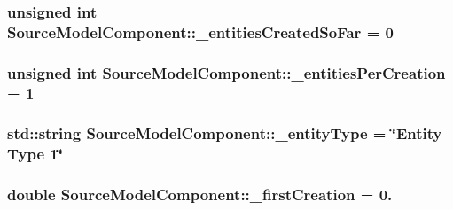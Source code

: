 \subsubsection[{\texorpdfstring{\+\_\+entities\+Created\+So\+Far}{_entitiesCreatedSoFar}}]{\setlength{\rightskip}{0pt plus 5cm}unsigned int Source\+Model\+Component\+::\+\_\+entities\+Created\+So\+Far = 0\hspace{0.3cm}{\ttfamily [protected]}}\hypertarget{class_source_model_component_af1f4fb38d2c0c4ac08235d7aec131bc9}{}\label{class_source_model_component_af1f4fb38d2c0c4ac08235d7aec131bc9}
\subsubsection[{\texorpdfstring{\+\_\+entities\+Per\+Creation}{_entitiesPerCreation}}]{\setlength{\rightskip}{0pt plus 5cm}unsigned int Source\+Model\+Component\+::\+\_\+entities\+Per\+Creation = 1\hspace{0.3cm}{\ttfamily [protected]}}\hypertarget{class_source_model_component_a68b0576903281a4716eb3ea0281dd133}{}\label{class_source_model_component_a68b0576903281a4716eb3ea0281dd133}
\subsubsection[{\texorpdfstring{\+\_\+entity\+Type}{_entityType}}]{\setlength{\rightskip}{0pt plus 5cm}std\+::string Source\+Model\+Component\+::\+\_\+entity\+Type = \char`\"{}Entity Type 1\char`\"{}\hspace{0.3cm}{\ttfamily [protected]}}\hypertarget{class_source_model_component_ad001e8ae30c828916f271ac72c7817d1}{}\label{class_source_model_component_ad001e8ae30c828916f271ac72c7817d1}
\subsubsection[{\texorpdfstring{\+\_\+first\+Creation}{_firstCreation}}]{\setlength{\rightskip}{0pt plus 5cm}double Source\+Model\+Component\+::\+\_\+first\+Creation = 0.\hspace{0.3cm}{\ttfamily [protected]}}\hypertarget{class_source_model_component_ad58dddde2b6a81d85f261fa8a11243b3}{}\label{class_source_model_component_ad58dddde2b6a81d85f261fa8a11243b3}
